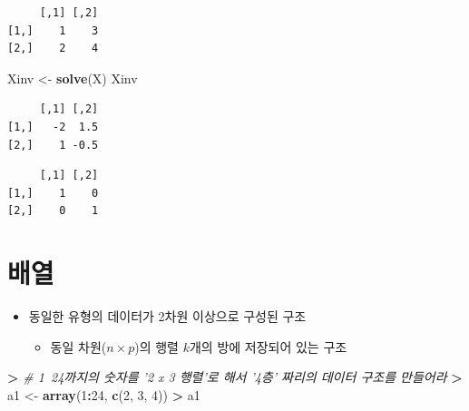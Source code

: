 \documentclass[11pt,a4paper]{book}
\newenvironment{Shaded}{\begin{snugshade}}{\end{snugshade}}
\newcommand{\KeywordTok}[1]{\textcolor[rgb]{0.13,0.29,0.53}{\textbf{#1}}}
\newcommand{\DecValTok}[1]{\textcolor[rgb]{0.00,0.00,0.81}{#1}}
\newcommand{\StringTok}[1]{\textcolor[rgb]{0.31,0.60,0.02}{#1}}
\newcommand{\CommentTok}[1]{\textcolor[rgb]{0.56,0.35,0.01}{\textit{#1}}}
\newcommand{\OperatorTok}[1]{\textcolor[rgb]{0.81,0.36,0.00}{\textbf{#1}}}
\newcommand{\ErrorTok}[1]{\textcolor[rgb]{0.64,0.00,0.00}{\textbf{#1}}}
\newcommand{\NormalTok}[1]{#1}
\providecommand{\tightlist}{%
  \setlength{\itemsep}{0pt}\setlength{\parskip}{0pt}}
\theoremstyle{definition}
\theoremstyle{definition}
\theoremstyle{definition}
\theoremstyle{remark}
\begin{document}
\begin{verbatim}
     [,1] [,2]
[1,]    1    3
[2,]    2    4
\end{verbatim}

\begin{Shaded}
\begin{Highlighting}[]
\NormalTok{Xinv <-}\StringTok{ }\KeywordTok{solve}\NormalTok{(X)}
\NormalTok{Xinv}
\end{Highlighting}
\end{Shaded}

\begin{verbatim}
     [,1] [,2]
[1,]   -2  1.5
[2,]    1 -0.5
\end{verbatim}

\begin{Shaded}
\end{Shaded}

\begin{verbatim}
     [,1] [,2]
[1,]    1    0
[2,]    0    1
\end{verbatim}

\normalsize

\section{배열}

\begin{itemize}
\tightlist
\item
  동일한 유형의 데이터가 2차원 이상으로 구성된 구조

  \begin{itemize}
  \tightlist
  \item
    동일 차원(\(n\times p\))의 행렬 \(k\)개의 방에 저장되어 있는 구조
  \end{itemize}
\end{itemize}

\footnotesize

\begin{Shaded}
\begin{Highlighting}[]
\OperatorTok{>}\StringTok{ }\CommentTok{# 1~24까지의 숫자를 '2 x 3 행렬'로 해서 '4층' 짜리의 데이터 구조를 만들어라}
\ErrorTok{>}\StringTok{ }\NormalTok{a1 <-}\StringTok{ }\KeywordTok{array}\NormalTok{(}\DecValTok{1}\OperatorTok{:}\DecValTok{24}\NormalTok{, }\KeywordTok{c}\NormalTok{(}\DecValTok{2}\NormalTok{, }\DecValTok{3}\NormalTok{, }\DecValTok{4}\NormalTok{))}
\OperatorTok{>}\StringTok{ }\NormalTok{a1}
\end{Highlighting}
\end{Shaded}
\end{document}
